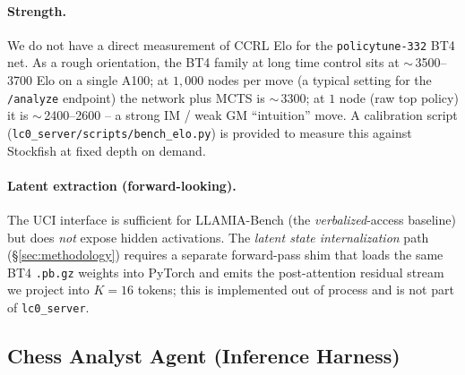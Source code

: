 \paragraph{Strength.}
We do not have a direct measurement of CCRL Elo for the \texttt{policytune-332} BT4 net. As a rough orientation, the BT4 family at long time control sits at $\sim$\,3500--3700 Elo on a single A100; at $1{,}000$ nodes per move (a typical setting for the \texttt{/analyze} endpoint) the network plus MCTS is $\sim$\,3300; at $1$ node (raw top policy) it is $\sim$\,2400--2600 -- a strong IM / weak GM ``intuition'' move. A calibration script (\texttt{lc0\_server/scripts/bench\_elo.py}) is provided to measure this against Stockfish at fixed depth on demand.

\paragraph{Latent extraction (forward-looking).}
The UCI interface is sufficient for LLAMIA-Bench (the \emph{verbalized}-access baseline) but does \emph{not} expose hidden activations. The \emph{latent state internalization} path (\S\ref{sec:methodology}) requires a separate forward-pass shim that loads the same BT4 \texttt{.pb.gz} weights into PyTorch and emits the post-attention residual stream we project into $K{=}16$ tokens; this is implemented out of process and is not part of \texttt{lc0\_server}.

\subsection{Chess Analyst Agent (Inference Harness)}
\label{app:details:agent}


